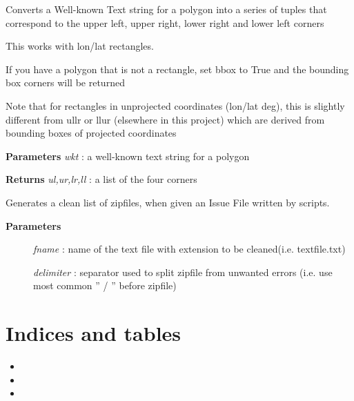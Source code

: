 \documentclass[letterpaper,10pt,english]{sphinxmanual}
\begin{document}
\begin{fulllineitems}
\label{code:Util.wktpoly2pts}
Converts a Well-known Text string for a polygon into a series of tuples that
correspond to the upper left, upper right, lower right and lower left corners

This works with lon/lat rectangles.

If you have a polygon that is not a rectangle, set bbox to True and the 
bounding box corners will be returned

Note that for rectangles in unprojected coordinates (lon/lat deg), this is 
slightly different from ullr or llur (elsewhere in this project) which are 
derived from bounding boxes of projected coordinates

\textbf{Parameters}
\emph{wkt} : a well-known text string for a polygon

\textbf{Returns}
\emph{ul,ur,lr,ll} : a list of the four corners

\end{fulllineitems}


\begin{fulllineitems}
\label{code:Util.writeIssueFile}
Generates a clean list of zipfiles, when given an Issue File written by scripts.
\begin{description}
\item[{\textbf{Parameters}}] \leavevmode
\emph{fname}     :   name of the text file with extension to be cleaned(i.e. textfile.txt)

\emph{delimiter} :   separator used to split zipfile from unwanted errors (i.e. use most common '' / '' before zipfile)

\end{description}

\end{fulllineitems}



\chapter{Indices and tables}
\label{index:indices-and-tables}\begin{itemize}
\item {} 

\item {} 

\item {} 

\end{itemize}
\end{document}
